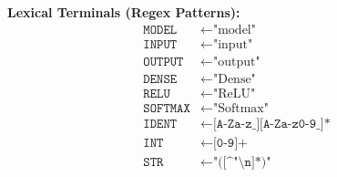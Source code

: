 \documentclass[11pt,a4paper]{article}
\begin{document}
\begin{minipage}[t]{0.42\linewidth}
\footnotesize
\textbf{Lexical Terminals (Regex Patterns):}
\begin{align*}
\texttt{MODEL}     &\leftarrow \text{"model"} \\
\texttt{INPUT}     &\leftarrow \text{"input"} \\
\texttt{OUTPUT}    &\leftarrow \text{"output"} \\
\texttt{DENSE}     &\leftarrow \text{"Dense"} \\
\texttt{RELU}      &\leftarrow \text{"ReLU"} \\
\texttt{SOFTMAX}   &\leftarrow \text{"Softmax"} \\
\texttt{IDENT}     &\leftarrow \texttt{[A-Za-z\_][A-Za-z0-9\_]*} \\
\texttt{INT}       &\leftarrow \texttt{[0-9]+} \\
\texttt{STR}       &\leftarrow \texttt{"([\textasciicircum"\textbackslash n]*)"}
\end{align*}
\end{minipage}

\vspace{-0.5em}
\end{document}
